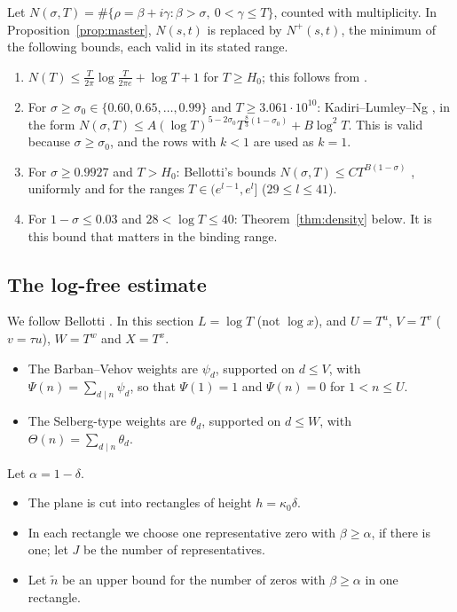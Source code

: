 \documentclass[11pt]{amsart}
\numberwithin{equation}{section}
\theoremstyle{definition}
\theoremstyle{remark}
\begin{document}
Let $N(\sigma,T) = \#\{\rho = \beta+i\gamma: \beta > \sigma,\ 0 < \gamma \le T\}$, counted with multiplicity.
In Proposition~\ref{prop:master}, $N(s,t)$ is replaced by $N^+(s,t)$, the minimum of the following bounds, each valid in its stated range.
\begin{enumerate}
\item[(N1)] $N(T) \le \frac T{2\pi}\log\frac T{2\pi e} + \log T + 1$ for $T \ge H_0$; this follows from \cite{HSW}.
\item[(N2)] For $\sigma \ge \sigma_0 \in\{0.60, 0.65, \dots, 0.99\}$ and $T \ge 3.061\cdot 10^{10}$: Kadiri--Lumley--Ng \cite[Table~1]{KLN}, in the form $N(\sigma,T) \le A(\log T)^{5-2\sigma_0}T^{\frac83(1-\sigma_0)} + B\log^2T$.
  This is valid because $\sigma \ge \sigma_0$, and the rows with $k < 1$ are used as $k = 1$.
\item[(N3)] For $\sigma \ge 0.9927$ and $T > H_0$: Bellotti's bounds $N(\sigma,T) \le CT^{B(1-\sigma)}$ \cite[Thm.~1.1, Table~2]{Bellotti}, uniformly and for the ranges $T\in(e^{l-1},e^l]$ ($29\le l\le41$).
\item[(N4)] For $1-\sigma \le 0.03$ and $28 < \log T \le 40$: Theorem~\ref{thm:density} below.
  It is this bound that matters in the binding range.
\end{enumerate}

\subsection{The log-free estimate}
We follow Bellotti \cite[\S\S3--4]{Bellotti}. In this section $L = \log T$ (not $\log x$), and $U = T^u$, $V = T^v$ ($v = \tau u$), $W = T^w$ and $X = T^x$.
\begin{itemize}
\item The Barban--Vehov weights are $\psi_d$, supported on $d\le V$, with $\Psi(n) = \sum_{d\mid n}\psi_d$, so that $\Psi(1) = 1$ and $\Psi(n) = 0$ for $1 < n \le U$.
\item The Selberg-type weights are $\theta_d$, supported on $d\le W$, with $\Theta(n) = \sum_{d\mid n}\theta_d$.
\end{itemize}
Let $\alpha = 1-\delta$.
\begin{itemize}
\item The plane is cut into rectangles of height $h = \kappa_0\delta$.
\item In each rectangle we choose one representative zero with $\beta \ge \alpha$, if there is one; let $J$ be the number of representatives.
\item Let $\tilde n$ be an upper bound for the number of zeros with $\beta\ge\alpha$ in one rectangle.
\end{itemize}
\end{document}
